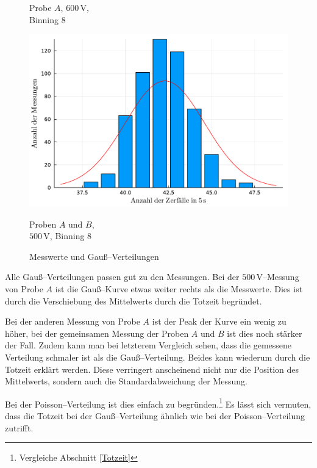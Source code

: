 \documentclass[12pt,a4paper]{scrartcl}
\numberwithin{equation}{section} %
\begin{document}
\begin{figure}[h!]
\begin{minipage}{0.3\textwidth}
		\caption*{Probe $A$, $600 \mathrm{\, V}$,\\Binning $8$}
	\end{minipage}
	\begin{minipage}{0.3\textwidth}
		\centering
		\includegraphics[width=\textwidth]{../media/B3.1/gauss3.pdf}
		\caption*{Proben $A$ und $B$,\\$500 \mathrm{\, V}$, Binning $8$}
	\end{minipage}
	\vspace{3pt}
	
	\vspace{3pt}
	
	\caption{Messwerte und Gauß--Verteilungen}
	\label{fig:gauss single}
	\vspace{12pt}
\end{figure}

\noindent
Alle Gauß--Verteilungen passen gut zu den Messungen. Bei der $500\mathrm{\,V}$--Messung von Probe $A$ ist die Gauß--Kurve etwas weiter rechts als die Messwerte. Dies ist durch die Verschiebung des Mittelwerts durch die Totzeit begründet.

Bei der anderen Messung von Probe $A$ ist der Peak der Kurve ein wenig zu höher, bei der gemeinsamen Messung der Proben $A$ und $B$ ist dies noch stärker der Fall. Zudem kann man bei letzterem Vergleich sehen, dass die gemessene Verteilung schmaler ist als die Gauß--Verteilung. Beides kann wiederum durch die Totzeit erklärt werden. Diese verringert anscheinend nicht nur die Position des Mittelwerts, sondern auch die Standardabweichung der Messung.

Bei der Poisson--Verteilung ist dies einfach zu begründen.\footnote{Vergleiche Abschnitt \ref{Totzeit}} Es lässt sich vermuten, dass die Totzeit bei der Gauß--Verteilung ähnlich wie bei der Poisson--Verteilung zutrifft.
\end{document}

